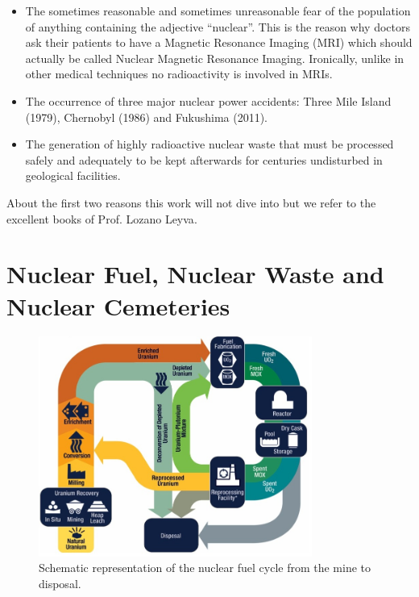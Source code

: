 \begin{itemize}
 \item The sometimes reasonable and sometimes unreasonable fear of the po\-pu\-lation of 
anything 
containing the adjective 
``nuclear''. This is the reason why doctors ask their patients to have a Magnetic Resonance 
Imaging (MRI) which should actually be called Nuclear Magnetic Resonance 
Imaging. Ironically, unlike in other medical techniques no radioactivity is involved in MRIs. 
 \item The occurrence of three major nuclear power accidents: Three 
Mile Island (1979), Chernobyl (1986) and Fukushima (2011).
 \item The generation of highly radioactive nuclear waste that must be processed safely and 
adequately to be kept afterwards for centuries undisturbed in geological facilities. 
\end{itemize}

About the first two reasons this work will not dive into but we refer to the excellent books of 
Prof. Lozano 
Leyva\cite{NuclearesLozano,FukushimaLozano}. 

\section{Nuclear Fuel, Nuclear Waste and Nuclear Cemeteries}
\begin{figure}
     \centering
         \includegraphics[width=0.8\textwidth]{images/The_Nuclear_Fuel_Cycle.jpg} 
        \caption[Nuclear Fuel Cycle]{Schematic representation of the nuclear fuel cycle from the 
mine to disposal.\cite{NuclearFuelCycle} }
        \label{FuelCycle}
\end{figure}

